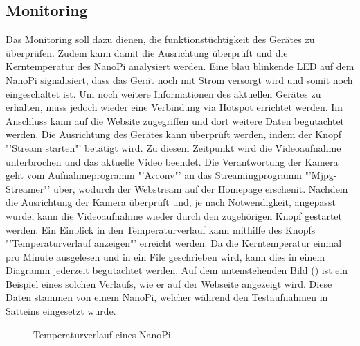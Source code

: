 \subsection{Monitoring}
Das Monitoring soll dazu dienen, die funktionstüchtigkeit des Gerätes zu überprüfen. Zudem kann damit die Ausrichtung überprüft und die Kerntemperatur des NanoPi analysiert werden. Eine blau blinkende LED auf dem NanoPi signalisiert, dass das Gerät noch mit Strom versorgt wird und somit noch eingeschaltet ist. Um noch weitere Informationen des aktuellen Gerätes zu erhalten, muss jedoch wieder eine Verbindung via Hotspot errichtet werden. Im Anschluss kann auf die Website zugegriffen und dort weitere Daten begutachtet werden. Die Ausrichtung des Gerätes kann überprüft werden, indem der Knopf "'Stream starten"' betätigt wird. Zu diesem Zeitpunkt wird die Videoaufnahme unterbrochen und das aktuelle Video beendet. Die Verantwortung der Kamera geht vom Aufnahmeprogramm "'Avconv"' an das Streamingprogramm "'Mjpg-Streamer"' über, wodurch der Webstream auf der Homepage erschenit. Nachdem die Ausrichtung der Kamera überprüft und, je nach Notwendigkeit, angepasst wurde, kann die Videoaufnahme wieder durch den zugehörigen Knopf gestartet werden. Ein Einblick in den Temperaturverlauf kann mithilfe des Knopfs "'Temperaturverlauf anzeigen"' erreicht werden. Da die Kerntemperatur einmal pro Minute ausgelesen und in ein File geschrieben wird, kann dies in einem Diagramm jederzeit begutachtet werden. Auf dem untenstehenden Bild () ist ein Beispiel eines solchen Verlaufs, wie er auf der Webseite angezeigt wird. Diese Daten stammen von einem NanoPi, welcher während den Testaufnahmen in Satteins eingesetzt wurde.

\begin{figure}[H]
  \centering
  \caption{Temperaturverlauf eines NanoPi}
  \label{bTemperature}
\end{figure} 